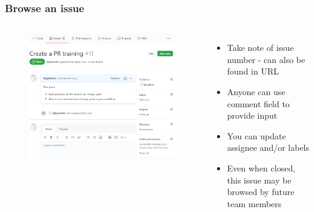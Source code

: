 \documentclass[aspectratio=169]{beamer} %
\begin{document}
\begin{frame}
	\frametitle{Browse an issue}
	\begin{columns}[c]
		
		\vspace{-.5cm}
		\begin{figure}
			\centering
			\includegraphics[width=\textwidth]{./img/create-issue-2.png}
		\end{figure}
		
		
		\begin{itemize}
			\setlength\itemsep{1em}
			\item Take note of issue number - can also be found in URL
			\item Anyone can use comment field to provide input
			\item You can update assignee and/or labels
			\item Even when closed, this issue may be browsed by future team members
		\end{itemize}
		
	\end{columns}	
\end{frame}
\end{document}
